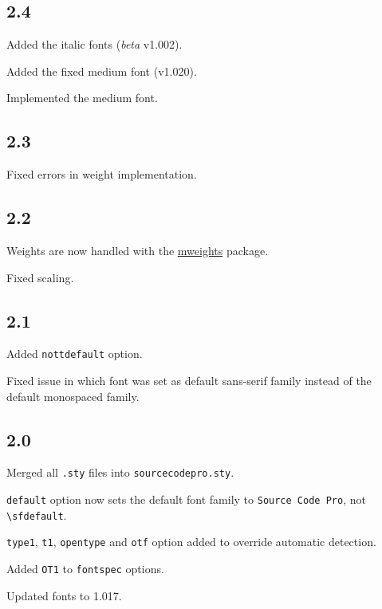 \documentclass[10pt,a4paper,english]{article}
\begin{document}
\begin{multicols}{2}
\subsection*{2.4}
\begin{itemize*}
	\item Added the italic fonts (\emph{beta} v1.002).
	\item Added the fixed medium font (v1.020).
	\item Implemented the medium font.
\end{itemize*}

\subsection*{2.3}
\begin{itemize*}
	\item Fixed errors in weight implementation.
\end{itemize*}

\subsection*{2.2}
\begin{itemize*}
	\item Weights are now handled with the \href{http://www.ctan.org/pkg/mweights}{mweights} package.
	\item Fixed scaling.
\end{itemize*}

\subsection*{2.1}
\begin{itemize*}
	\item Added \texttt{nottdefault} option.
	\item Fixed issue in which font was set as default sans-serif family instead of the default monospaced family.
\end{itemize*}

\subsection*{2.0}
\begin{itemize*}
	\item Merged all \texttt{.sty} files into \texttt{sourcecodepro.sty}.
	\item \texttt{default} option now sets the default font family to \texttt{Source Code Pro}, not \texttt{\textbackslash sfdefault}.
	\item \texttt{type1}, \texttt{t1}, \texttt{opentype} and \texttt{otf} option added to override automatic detection.
	\item Added \texttt{OT1} to \texttt{fontspec} options.
	\item Updated fonts to 1.017.
\end{itemize*}


\end{multicols}
\end{document}
